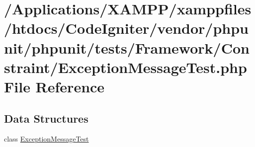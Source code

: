 \hypertarget{_exception_message_test_8php}{}\section{/\+Applications/\+X\+A\+M\+P\+P/xamppfiles/htdocs/\+Code\+Igniter/vendor/phpunit/phpunit/tests/\+Framework/\+Constraint/\+Exception\+Message\+Test.php File Reference}
\label{_exception_message_test_8php}
\subsection*{Data Structures}
\begin{DoxyCompactItemize}
\item 
class \mbox{\hyperlink{class_exception_message_test}{Exception\+Message\+Test}}
\end{DoxyCompactItemize}
